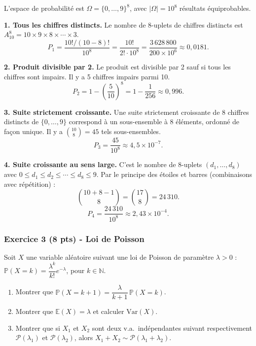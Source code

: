 \documentclass[12pt,a4paper]{article}
\begin{document}
\begin{boitecorrige}
L'espace de probabilité est $\Omega = \{0,\ldots,9\}^8$, avec $|\Omega| = 10^8$ résultats équiprobables.

\textbf{1. Tous les chiffres distincts.}
Le nombre de 8-uplets de chiffres distincts est $A_{10}^8 = 10 \times 9 \times 8 \times \cdots \times 3$.
\[
P_1 = \frac{10!/(10-8)!}{10^8} = \frac{10!}{2!\cdot 10^8}
     = \frac{3\,628\,800}{200\times 10^6} \approx \boxed{0{,}0181}.
\]

\textbf{2. Produit divisible par 2.}
Le produit est divisible par 2 sauf si tous les chiffres sont impairs. Il y a 5 chiffres impairs parmi 10.
\[
P_2 = 1 - \left(\frac{5}{10}\right)^8 = 1 - \frac{1}{256} \approx \boxed{0{,}996}.
\]

\textbf{3. Suite strictement croissante.}
Une suite strictement croissante de 8 chiffres distincts de $\{0,\ldots,9\}$ correspond à un sous-ensemble à 8 éléments, ordonné de façon unique. Il y a $\binom{10}{8} = 45$ tels sous-ensembles.
\[
P_3 = \frac{45}{10^8} \approx \boxed{4{,}5 \times 10^{-7}}.
\]

\textbf{4. Suite croissante au sens large.}
C'est le nombre de 8-uplets $(d_1,\ldots,d_8)$ avec $0\leq d_1\leq d_2\leq\cdots\leq d_8\leq 9$. Par le principe des étoiles et barres (combinaisons avec répétition) :
\[
\binom{10+8-1}{8} = \binom{17}{8} = 24\,310.
\]
\[
P_4 = \frac{24\,310}{10^8} \approx \boxed{2{,}43 \times 10^{-4}}.
\]
\end{boitecorrige}

\subsubsection*{Exercice 3 (8 pts) - Loi de Poisson \niveau{\difficile}}

\begin{boiteexercice}
Soit $X$ une variable aléatoire suivant une loi de Poisson de paramètre $\lambda > 0$ : $\mathbb{P}(X=k) = \dfrac{\lambda^k}{k!}e^{-\lambda}$, pour $k \in \mathbb{N}$.
\begin{enumerate}
  \item Montrer que $\mathbb{P}(X=k+1) = \dfrac{\lambda}{k+1}\,\mathbb{P}(X=k)$.
  \item Montrer que $\mathbb{E}(X) = \lambda$ et calculer $\mathrm{Var}(X)$.
  \item Montrer que si $X_1$ et $X_2$ sont deux v.a.\ indépendantes suivant respectivement $\mathcal{P}(\lambda_1)$ et $\mathcal{P}(\lambda_2)$, alors $X_1+X_2 \sim \mathcal{P}(\lambda_1+\lambda_2)$.
\end{enumerate}
\end{boiteexercice}
\end{document}

